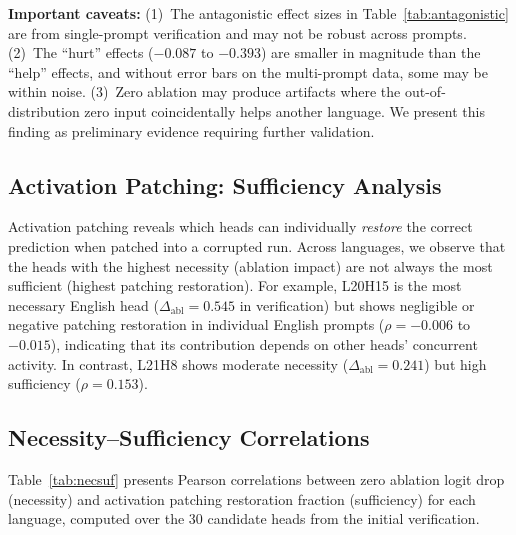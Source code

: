 \documentclass[11pt]{article}
\begin{document}
\textbf{Important caveats:} (1)~The antagonistic effect sizes in Table~\ref{tab:antagonistic} are from single-prompt verification and may not be robust across prompts.
(2)~The ``hurt'' effects ($-0.087$ to $-0.393$) are smaller in magnitude than the ``help'' effects, and without error bars on the multi-prompt data, some may be within noise.
(3)~Zero ablation may produce artifacts where the out-of-distribution zero input coincidentally helps another language.
We present this finding as preliminary evidence requiring further validation.

\subsection{Activation Patching: Sufficiency Analysis}
\label{sec:results:patching}

Activation patching reveals which heads can individually \emph{restore} the correct prediction when patched into a corrupted run.
Across languages, we observe that the heads with the highest necessity (ablation impact) are not always the most sufficient (highest patching restoration).
For example, L20H15 is the most necessary English head ($\Delta_{\text{abl}} = 0.545$ in verification) but shows negligible or negative patching restoration in individual English prompts ($\rho = -0.006$ to $-0.015$), indicating that its contribution depends on other heads' concurrent activity.
In contrast, L21H8 shows moderate necessity ($\Delta_{\text{abl}} = 0.241$) but high sufficiency ($\rho =  0.153$).

\subsection{Necessity--Sufficiency Correlations}
\label{sec:results:necsuf}

Table~\ref{tab:necsuf} presents Pearson correlations between zero ablation logit drop (necessity) and activation patching restoration fraction (sufficiency) for each language, computed over the 30 candidate heads from the initial verification.
\end{document}
